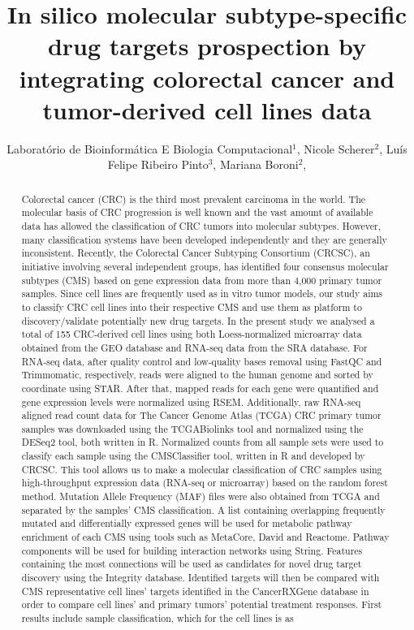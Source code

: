 \documentclass[twoside]{article}
\title{\vspace{-15mm}\fontsize{24pt}{10pt}\selectfont\textbf{ In silico molecular subtype-specific drug targets prospection by integrating colorectal cancer and tumor-derived cell lines data }} %
\author{ Laboratório de Bioinformática E Biologia Computacional$^{1}$, Nicole Scherer$^{2}$, Luís Felipe Ribeiro Pinto$^{3}$, Mariana Boroni$^{2}$, }
\affil{ 1 LBBC/INCA

2 Laboratório de Bioinformática e Biologia Computacional

3 Programa de Carcinogênese Molecular

 }
\date{}
\begin{document}
  
  
  \maketitle %
  
  
  \thispagestyle{fancy} %
  
  
  \begin{abstract}
  Colorectal cancer (CRC) is the third most prevalent carcinoma in the world. The molecular basis of CRC progression is well known and the vast amount of available data has allowed the classification of CRC tumors into molecular subtypes. However, many classification systems have been developed independently and they are generally inconsistent. Recently, the Colorectal Cancer Subtyping Consortium (CRCSC), an initiative involving several independent groups, has identified four consensus molecular subtypes (CMS) based on gene expression data from more than 4,000 primary tumor samples. Since cell lines are frequently used as in vitro tumor models, our study aims to classify CRC cell lines into their respective CMS and use them as platform to discovery/validate potentially new drug targets. In the present study we analysed a total of 155 CRC-derived cell lines using both  Loess-normalized microarray data obtained from the GEO database and RNA-seq data from the SRA database. For RNA-seq data, after quality control and low-quality bases removal using FastQC and Trimmomatic, respectively, reads were aligned to the human genome and sorted by coordinate using STAR. After that, mapped reads for each gene were quantified and gene expression levels were normalized using RSEM. Additionally, raw RNA-seq aligned read count data for The Cancer Genome Atlas (TCGA) CRC primary tumor samples was downloaded using the TCGABiolinks tool and normalized using the DESeq2 tool, both written in R. Normalized counts from all sample sets were used to classify each sample using the CMSClassifier tool, written in R and developed by CRCSC. This tool allows us to make a molecular classification of CRC samples using high-throughput expression data (RNA-seq or microarray) based on the random forest method. Mutation Allele Frequency (MAF) files were also obtained from TCGA and separated by the samples’ CMS classification. A list containing overlapping frequently mutated and differentially expressed genes will be used for metabolic pathway enrichment of each CMS using tools such as MetaCore, David and Reactome. Pathway components will be used for building interaction networks using String. Features containing the most connections will be used as candidates for novel drug target discovery using the Integrity database. Identified targets will then be compared with CMS representative cell lines’ targets identified in the CancerRXGene database in order to compare cell lines’ and primary tumors’ potential treatment responses. First results include sample classification, which for the cell lines is as 
\end{abstract}
\end{document}
